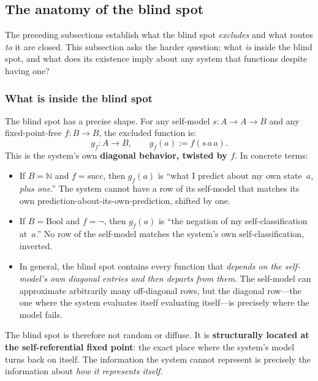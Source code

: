 \documentclass[11pt]{article}
\begin{document}
\subsection{The anatomy of the blind spot}
\label{sec:blind-spot-anatomy}

The preceding subsections establish what the blind spot \emph{excludes}
and what routes \emph{to} it are closed.  This subsection asks the
harder question: what \emph{is} inside the blind spot, and what does
its existence imply about any system that functions despite having one?

\subsubsection{What is inside the blind spot}

The blind spot has a precise shape.  For any self-model
$s : A \to A \to B$ and any fixed-point-free $f : B \to B$, the
excluded function is:
\[
  g_f : A \to B, \qquad g_f(a) := f(s\,a\,a).
\]
This is the system's own \textbf{diagonal behavior, twisted by $f$}.
In concrete terms:
\begin{itemize}[leftmargin=1.5em,itemsep=0.2ex,topsep=0.4ex,parsep=0pt]
\item If $B = \mathbb{N}$ and $f = \mathrm{succ}$, then $g_f(a)$ is
  ``what I predict about my own state~$a$, \emph{plus one}.''  The
  system cannot have a row of its self-model that matches its own
  prediction-about-its-own-prediction, shifted by one.
\item If $B = \mathrm{Bool}$ and $f = \lnot$, then $g_f(a)$ is
  ``the negation of my self-classification at~$a$.''  No row of
  the self-model matches the system's own self-classification, inverted.
\item In general, the blind spot contains every function that
  \emph{depends on the self-model's own diagonal entries and then
  departs from them}.  The self-model can approximate arbitrarily
  many off-diagonal rows, but the diagonal row---the one where the
  system evaluates itself evaluating itself---is precisely where the
  model fails.
\end{itemize}

\noindent
The blind spot is therefore not random or diffuse.  It is
\textbf{structurally located at the self-referential fixed point}: the
exact place where the system's model turns back on itself.  The
information the system cannot represent is precisely the information
about \emph{how it represents itself}.
\end{document}
